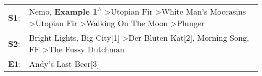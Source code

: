 \begin{supertabular}{p{0.03\textwidth}p{0.92\textwidth}}
 \textbf{S1}:  &  Nemo\textsuperscript{}, \enspace \textbf{Example 1\textsuperscript{$\wedge$}} \textgreater \enspace Utopian Fir\textsuperscript{} \textgreater \enspace White Man's Moccasins\textsuperscript{} \textgreater \enspace Utopian Fir\textsuperscript{} \textgreater \enspace Walking On The Moon\textsuperscript{} \textgreater \enspace Plunger\textsuperscript{}  \enspace  \\
 \textbf{S2}:  &                                                                                                                        Bright Lights, Big City[1]\textsuperscript{} \textgreater \enspace Der Bluten Kat[2]\textsuperscript{}, \enspace Morning Song\textsuperscript{}, \enspace FF\textsuperscript{} \textgreater \enspace The Fussy Dutchman\textsuperscript{}  \enspace  \\
 \textbf{E1}:  &                                                                                                                                                                                                                                                                                                                            Andy's Last Beer[3]\textsuperscript{}  \enspace  \\
\end{supertabular}
